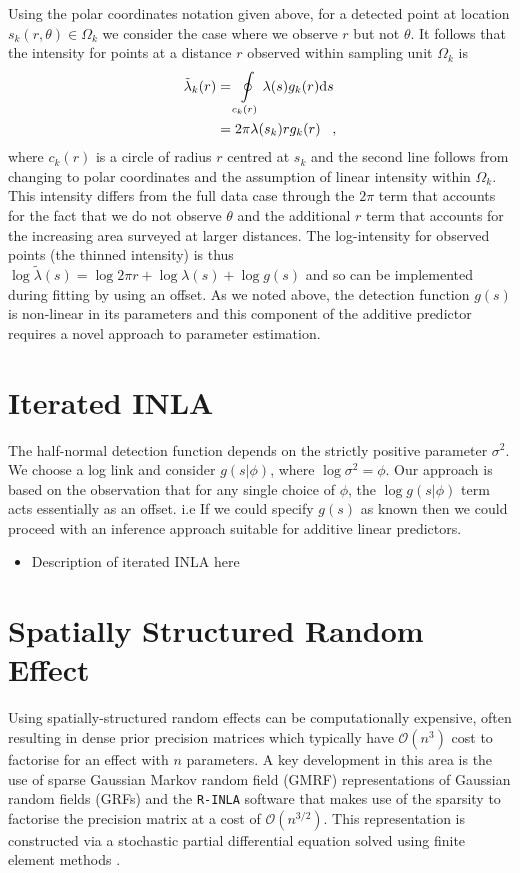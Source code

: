 \documentclass[preprint,12pt]{elsarticle}
\newcommand{\tl}{\tilde{\lambda}}   %
\begin{document}
Using the polar coordinates notation given above, for a detected point at location $s_k(r, \theta) \in \Omega_k$ we consider the case where we observe $r$ but not $\theta$.  It follows that the intensity for points at a distance $r$ observed within sampling unit $\Omega_k$ is
\begin{align}
\label{intensity-incomplete}
\tl_k(r) &= \oint\displaylimits_{c_k(r)} \lambda(s)g_k(r)\mathrm{d}s \nonumber \\
&= 2\pi\lambda(s_k)rg_k(r) \;\;\; ,
\end{align}
 where $c_k(r)$ is a circle of radius $r$ centred at $s_k$ and the second line follows from changing to polar coordinates and the assumption of linear intensity within $\Omega_k$.  This intensity differs from the full data case through the $2\pi$  term that accounts for the fact that we do not observe $\theta$ and the additional $r$ term that accounts for the increasing area surveyed at larger distances.  The log-intensity for observed points (the thinned intensity) is thus $\log\tl(s) = \log 2 \pi r + \log\lambda(s) + \log g(s)$ and so can be implemented during fitting by using an offset.  As we noted above, the detection function $g(s)$ is non-linear in its parameters and this component of the additive predictor requires a novel approach to parameter estimation.

\section{Iterated INLA}

The half-normal detection function depends on the strictly positive parameter $\sigma^2$.  We choose a log link and consider $g(s | \phi)$, where $\log\sigma^2 = \phi$.   Our approach is based on the observation that for any single choice of $\phi$, the $\log g(s | \phi)$ term acts essentially as an offset. i.e If we could specify $g(s)$ as known then we could proceed with an inference approach suitable for additive linear predictors.

\begin{itemize}
 \item Description of iterated INLA here
\end{itemize}

\section{Spatially Structured Random Effect}
\label{GMRFexplanation}

Using spatially-structured random effects can be computationally expensive, often resulting in dense prior precision matrices which typically have $\mathcal{O}(n^3)$ cost to factorise for an effect with $n$ parameters.  A key development in this area is the use of sparse Gaussian Markov random field (GMRF) representations of Gaussian random fields (GRFs) and the \texttt{R-INLA} software that makes use of the sparsity to factorise the precision matrix at a cost of $\mathcal{O}(n^{3/2})$.  This representation is constructed via a stochastic partial differential equation solved using finite element methods \citep{lindgren_explicit_2011}.
\end{document}
